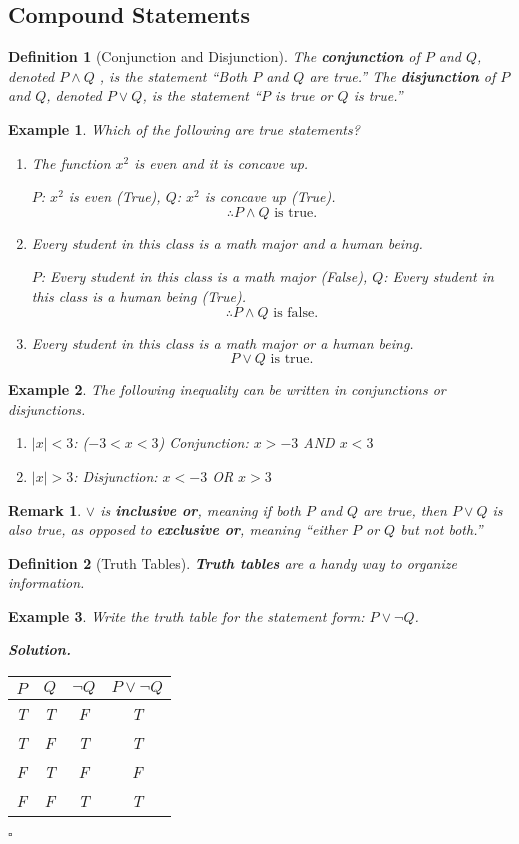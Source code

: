 \documentclass[12pt,a4paper]{article}
\newtheorem{df}{Definition}[subsection]
\newtheorem{eg}{Example}[subsection]
\newenvironment*{sol}{\par\indent\textbf{\textit{Solution. }}}{\hfill{$\square$}\par}
\newtheorem*{rmk}{\indent Remark}
\begin{document}
\subsection{Compound Statements}
\begin{df}[Conjunction and Disjunction]
	The \textbf{conjunction} of $P$ and $Q$, denoted $P\wedge Q$	, is the statement ``Both $P$ and $Q$ are true.'' The \textbf{disjunction} of $P$ and $Q$, denoted $P\vee Q$, is the statement ``$P$ is true or $Q$ is true.''
\end{df}
\begin{eg}
	Which of the following are true statements?
	\begin{enumerate}
	\item The function $x^2$ is even and it is concave up.
		
		$P$: $x^2$ is even (True), $Q$: $x^2$ is concave up (True).
		\[\therefore P\wedge Q\text{ is true.}\]
	\item Every student in this class is a math major and a human being.
		
		$P$: Every student in this class is a math major (False), $Q$: Every student in this class is a human being (True).
		\[\therefore P\wedge Q\text{ is false.}\]
	\item Every student in this class is a math major or a human being.
		\[P\vee Q\text{ is true.}\]
	\end{enumerate}
\end{eg}
\begin{eg}
	The following inequality can be written in conjunctions or disjunctions.
	\begin{enumerate}
		\item $|x|<3$: ($-3<x<3$) Conjunction: $x>-3$ AND $x<3$
		\item $|x|>3$: Disjunction: $x<-3$ OR $x>3$	
	\end{enumerate}
\end{eg}
\begin{rmk}
	$\vee$ is \textbf{inclusive or}, meaning if both $P$ and $Q$ are true, then $P\vee Q$ is also true, as opposed to \textbf{exclusive or}, meaning ``either $P$ or $Q$ but not both.''	
\end{rmk}
\begin{df}[Truth Tables]
	\textbf{Truth tables} are a handy way to organize information. 
\end{df}
\begin{eg}
	Write the truth table for the statement form: $P\vee\neg Q$.
	\begin{sol}\begin{center}\begin{tabular}{c|c|c|c}
		$P$&$Q$&$\neg Q$&$P\vee\neg Q$\\
		\hline
		T&T&F&T\\
		T&F&T&T\\
		F&T&F&F\\
		F&F&T&T
	\end{tabular}\end{center}\end{sol}
\end{eg}
\end{document}
